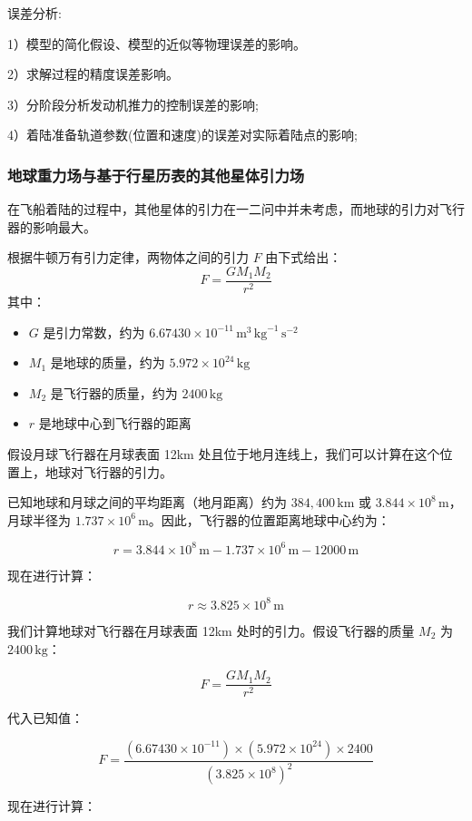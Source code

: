 \documentclass{ctexart}
\begin{document}
误差分析:

1）模型的简化假设、模型的近似等物理误差的影响。



2）求解过程的精度误差影响。


3）分阶段分析发动机推力的控制误差的影响;

4）着陆准备轨道参数(位置和速度)的误差对实际着陆点的影响;
\subsubsection{地球重力场与基于行星历表的其他星体引力场}
在飞船着陆的过程中，其他星体的引力在一二问中并未考虑，而地球的引力对飞行器的影响最大。

根据牛顿万有引力定律，两物体之间的引力 \( F \) 由下式给出：
\[
F = \frac{G M_1 M_2}{r^2}
\]
其中：
\begin{itemize}
	\renewcommand\labelitemi{} %
    \item \( G \) 是引力常数，约为 \( 6.67430 \times 10^{-11} \, \text{m}^3 \, \text{kg}^{-1} \, \text{s}^{-2} \)
    \item \( M_1 \) 是地球的质量，约为 \( 5.972 \times 10^{24} \, \text{kg} \)
    \item \( M_2 \) 是飞行器的质量，约为 \( 2400 \, \text{kg} \)
    \item \( r \) 是地球中心到飞行器的距离
\end{itemize}

假设月球飞行器在月球表面 12km 处且位于地月连线上，我们可以计算在这个位置上，地球对飞行器的引力。

已知地球和月球之间的平均距离（地月距离）约为 \( 384,400 \, \text{km} \) 或 \( 3.844 \times 10^8 \, \text{m} \)，月球半径为 \( 1.737 \times 10^6 \, \text{m} \)。因此，飞行器的位置距离地球中心约为：

\[
r = 3.844 \times 10^8 \, \text{m} - 1.737 \times 10^6 \, \text{m} - 12000 \, \text{m}
\]

现在进行计算：

\[
r \approx 3.825 \times 10^8 \, \text{m}
\]

我们计算地球对飞行器在月球表面 12km 处时的引力。假设飞行器的质量 \( M_2 \) 为 \( 2400 \, \text{kg} \)：

\[
F = \frac{G M_1 M_2}{r^2}
\]

代入已知值：

\[
F = \frac{(6.67430 \times 10^{-11}) \times (5.972 \times 10^{24}) \times 2400}{(3.825 \times 10^8)^2}
\]

现在进行计算：
\end{document}
